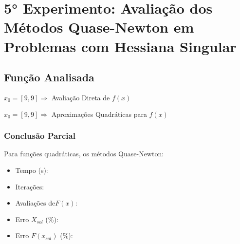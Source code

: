 

\section{5° Experimento: Avaliação dos Métodos Quase-Newton em Problemas com Hessiana Singular}
    \subsection{Função Analisada}

        \begin{minipage}[h!]{\linewidth}
            \centering
            $x_0=[9,9]\Longrightarrow$  Avaliação Direta de $f(x)$            
            \label{tab:tblz} 
            \writetable{\tblz}\par
            \bigskip
            \centering
            $x_0=[9,9]\Longrightarrow$  Aproximações Quadráticas para $f(x)$
            \label{tab:tblw} 
            \writetable{\tblw}
        \end{minipage}

        \subsubsection{Conclusão Parcial}
            Para funções quadráticas, os métodos Quase-Newton:
            \begin{itemize}
            \item {Tempo (s):} 
            \item {Iterações:} 
            \item {Avaliações de$F(x)$:} 
            \item {Erro $X_{sol}$ (\%):} 
            \item {Erro $F(x_{sol})$ (\%):} 
            \end{itemize}
        
\newpage